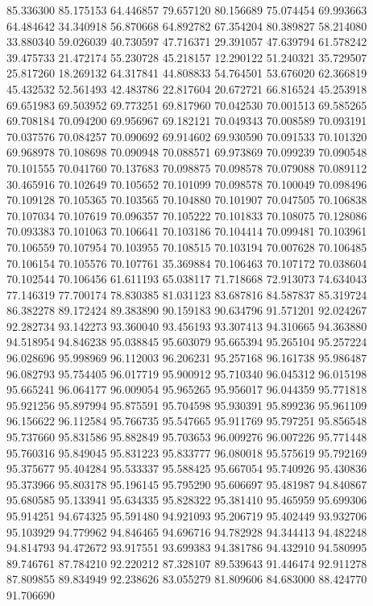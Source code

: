 85.336300
85.175153
64.446857
79.657120
80.156689
75.074454
69.993663
64.484642
34.340918
56.870668
64.892782
67.354204
80.389827
58.214080
33.880340
59.026039
40.730597
47.716371
29.391057
47.639794
61.578242
39.475733
21.472174
55.230728
45.218157
12.290122
51.240321
35.729507
25.817260
18.269132
64.317841
44.808833
54.764501
53.676020
62.366819
45.432532
52.561493
42.483786
22.817604
20.672721
66.816524
45.253918
69.651983
69.503952
69.773251
69.817960
70.042530
70.001513
69.585265
69.708184
70.094200
69.956967
69.182121
70.049343
70.008589
70.093191
70.037576
70.084257
70.090692
69.914602
69.930590
70.091533
70.101320
69.968978
70.108698
70.090948
70.088571
69.973869
70.099239
70.090548
70.101555
70.041760
70.137683
70.098875
70.098578
70.079088
70.089112
30.465916
70.102649
70.105652
70.101099
70.098578
70.100049
70.098496
70.109128
70.105365
70.103565
70.104880
70.101907
70.047505
70.106838
70.107034
70.107619
70.096357
70.105222
70.101833
70.108075
70.128086
70.093383
70.101063
70.106641
70.103186
70.104414
70.099481
70.103961
70.106559
70.107954
70.103955
70.108515
70.103194
70.007628
70.106485
70.106154
70.105576
70.107761
35.369884
70.106463
70.107172
70.038604
70.102544
70.106456
61.611193
65.038117
71.718668
72.913073
74.634043
77.146319
77.700174
78.830385
81.031123
83.687816
84.587837
85.319724
86.382278
89.172424
89.383890
90.159183
90.634796
91.571201
92.024267
92.282734
93.142273
93.360040
93.456193
93.307413
94.310665
94.363880
94.518954
94.846238
95.038845
95.603079
95.665394
95.265104
95.257224
96.028696
95.998969
96.112003
96.206231
95.257168
96.161738
95.986487
96.082793
95.754405
96.017719
95.900912
95.710340
96.045312
96.015198
95.665241
96.064177
96.009054
95.965265
95.956017
96.044359
95.771818
95.921256
95.897994
95.875591
95.704598
95.930391
95.899236
95.961109
96.156622
96.112584
95.766735
95.547665
95.911769
95.797251
95.856548
95.737660
95.831586
95.882849
95.703653
96.009276
96.007226
95.771448
95.760316
95.849045
95.831223
95.833777
96.080018
95.575619
95.792169
95.375677
95.404284
95.533337
95.588425
95.667054
95.740926
95.430836
95.373966
95.803178
95.196145
95.795290
95.606697
95.481987
94.840867
95.680585
95.133941
95.634335
95.828322
95.381410
95.465959
95.699306
95.914251
94.674325
95.591480
94.921093
95.206719
95.402449
93.932706
95.103929
94.779962
94.846465
94.696716
94.782928
94.344413
94.482248
94.814793
94.472672
93.917551
93.699383
94.381786
94.432910
94.580995
89.746761
87.784210
92.220212
87.328107
89.539643
91.446474
92.911278
87.809855
89.834949
92.238626
83.055279
81.809606
84.683000
88.424770
91.706690
